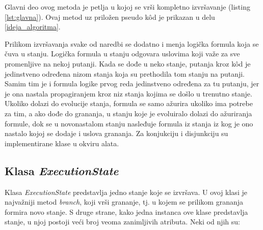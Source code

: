 \documentclass[12pt,oneside]{memoir}
\begin{document}
Glavni deo ovog metoda je petlja u kojoj se vrši kompletno izvršavanje (listing \ref{lst:glavna}). Ovaj metod uz priložen pseudo k\^od je prikazan u delu \ref{ideja_algoritma}.

Prilikom izvršavanja svake od naredbi se dodatno i menja logička formula koja se čuva u stanju. Logička formula u stanju odgovara uslovima koji važe za sve promenljive na nekoj putanji. Kada se dođe u neko stanje, putanja kroz k\^od je jedinstveno određena nizom stanja koja su prethodila tom stanju na putanji. Samim tim je i formula logike prvog reda jedinstveno određena za tu putanju, jer je ona nastala propagiranjem kroz niz stanja kojima se došlo u trenutno stanje. Ukoliko dolazi do evolucije stanja, formula se samo ažurira ukoliko ima potrebe za tim, a ako dođe do grananja, u stanju koje je evoluiralo dolazi do ažuriranja formule, dok se u novonastalom stanju nasleđuje formula iz stanja iz kog je ono nastalo kojoj se dodaje i uslova grananja. Za konjukciju i disjunkciju su implementirane klase u okviru alata.    
    
\subsection{Klasa \textit{ExecutionState}}
Klasa \textit{ExecutionState} predstavlja jedno stanje koje se izvršava. U ovoj klasi je najvažniji metod \textit{branch}, koji vrši grananje, tj. u kojem se prilikom grananja formira novo stanje. S druge strane, kako jedna instanca ove klase predstavlja stanje, u njoj postoji veći broj veoma zanimljivih atributa. Neki od njih su:
\end{document}
